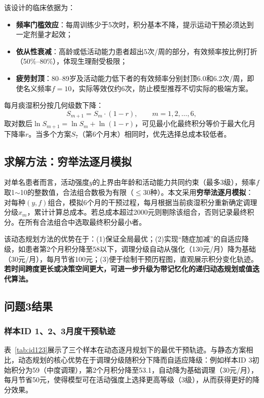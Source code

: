 \documentclass[a4paper,12pt]{ctexart}
\begin{document}
该设计的临床依据为：
\begin{itemize}
    \item \textbf{频率门槛效应}：每周训练少于5次时，积分基本不降，提示运动干预必须达到一定剂量才起效；
    \item \textbf{依从性衰减}：高龄或低活动能力患者超出5次/周的部分，有效频率按比例打折（50\%--80\%），体现生理耐受极限；
    \item \textbf{疲劳封顶}：80--89岁及活动能力低下者的有效频率分别封顶6.0和6.2次/周，即使名义频率$f=10$，实际等效仅约6次，防止模型推荐不切实际的极端方案。
\end{itemize}

每月痰湿积分按几何级数下降：
\begin{equation}
S_{m+1} = S_m \cdot (1-r), \qquad m=1,2,\dots,6,
\end{equation}
取对数后$\ln S_{m+1} = \ln S_m + \ln(1-r)$，可见最小化最终积分等价于最大化月下降率$r$。当多个方案$S_7$（第6个月末）相同时，优先选择总成本较低者。

\subsection{求解方法：穷举法逐月模拟}
对单名患者而言，活动强度$y$的上界由年龄和活动能力共同约束（最多3级），频率$f$取1$\sim$10的整数值，合法组合数极为有限（$\leq30$种）。本文采用\textbf{穷举法逐月模拟}：对每种$(y,f)$组合，模拟6个月的干预过程，每月根据当前痰湿积分重新确定调理分级$x_m$，累计计算总成本。若总成本超过2000元则剔除该组合，否则记录最终积分。在所有合法组合中选取最终积分最小者。

该动态规划方法的优势在于：(1)保证全局最优；(2)实现``随症加减''的自适应降级，如患者第2个月积分降至58以下，调理分级自动从强化（130元/月）降为基础（30元/月），每月节省100元；(3)便于绘制干预历程图，直观展示积分变化轨迹。\textbf{若时间跨度更长或决策空间更大，可进一步升级为带记忆化的递归动态规划或值迭代算法。}

\subsection{问题3结果}

\subsubsection{样本ID 1、2、3月度干预轨迹}

表~\ref{tab:id123}展示了三个样本在动态逐月规划下的最优干预轨迹。与静态方案相比，动态规划的核心优势在于调理分级随积分下降而自适应降级：例如样本ID 3初始积分为59（中度调理），第2个月积分降至53.1，自动降为基础调理（30元/月），每月节省50元，使得模型可在活动强度上选择更高等级（3级），从而获得更好的降分效果。
\end{document}
